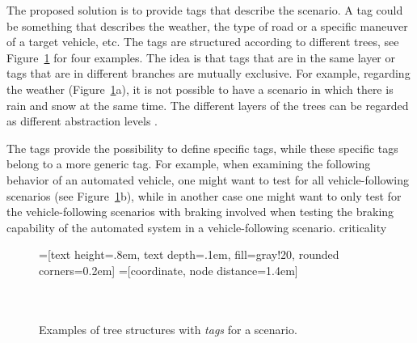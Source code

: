 The proposed solution is to provide tags that describe the scenario. A tag could be something that describes the weather, the type of road or a specific maneuver of a target vehicle, etc. The tags are structured according to different trees, see Figure~\ref{fig:tag trees} for four examples. The idea is that tags that are in the same layer or tags that are in different branches are mutually exclusive. For example, regarding the weather (Figure~\ref{fig:tag trees}a), it is not possible to have a scenario in which there is rain and snow at the same time. The different layers of the trees can be regarded as different abstraction levels \cite{Bonnin2014}. 

The tags provide the possibility to define specific tags, while these specific tags belong to a more generic tag. For example, when examining the following behavior of an automated vehicle, one might want to test for all vehicle-following scenarios (see Figure~\ref{fig:tag trees}b), while in another case one might want to only test for the vehicle-following scenarios with braking involved when testing the braking capability of the automated system in a vehicle-following scenario. criticality

\begin{figure}
	\begin{center}
		=[text height=.8em, text depth=.1em, fill=gray!20, rounded corners=0.2em]
		=[coordinate, node distance=1.4em]
		 \\
		\\
		 \\
		\caption{Examples of tree structures with \emph{tags} for a scenario.}
		\label{fig:tag trees}
	\end{center}
\end{figure}
